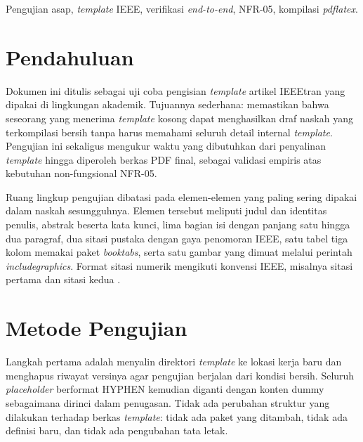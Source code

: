 \documentclass[journal]{IEEEtran}
\begin{document}
\begin{IEEEkeywords}
Pengujian asap, \textit{template} IEEE, verifikasi \textit{end-to-end}, NFR-05, kompilasi \textit{pdflatex}.
\end{IEEEkeywords}


\section{Pendahuluan}

Dokumen ini ditulis sebagai uji coba pengisian \textit{template} artikel IEEEtran yang dipakai di lingkungan akademik. Tujuannya sederhana: memastikan bahwa seseorang yang menerima \textit{template} kosong dapat menghasilkan draf naskah yang terkompilasi bersih tanpa harus memahami seluruh detail internal \textit{template}. Pengujian ini sekaligus mengukur waktu yang dibutuhkan dari penyalinan \textit{template} hingga diperoleh berkas PDF final, sebagai validasi empiris atas kebutuhan non-fungsional NFR-05.

Ruang lingkup pengujian dibatasi pada elemen-elemen yang paling sering dipakai dalam naskah sesungguhnya. Elemen tersebut meliputi judul dan identitas penulis, abstrak beserta kata kunci, lima bagian isi dengan panjang satu hingga dua paragraf, dua sitasi pustaka dengan gaya penomoran IEEE, satu tabel tiga kolom memakai paket \textit{booktabs}, serta satu gambar yang dimuat melalui perintah \textit{includegraphics}. Format sitasi numerik mengikuti konvensi IEEE, misalnya sitasi pertama \cite{contoh_artikel_jurnal} dan sitasi kedua \cite{contoh_buku}.

\section{Metode Pengujian}

Langkah pertama adalah menyalin direktori \textit{template} ke lokasi kerja baru dan menghapus riwayat versinya agar pengujian berjalan dari kondisi bersih. Seluruh \textit{placeholder} berformat HYPHEN kemudian diganti dengan konten dummy sebagaimana dirinci dalam penugasan. Tidak ada perubahan struktur yang dilakukan terhadap berkas \textit{template}: tidak ada paket yang ditambah, tidak ada definisi baru, dan tidak ada pengubahan tata letak.
\end{document}
